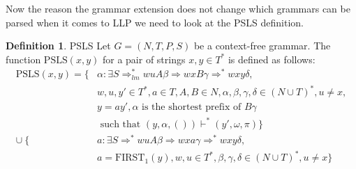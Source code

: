 \documentclass[a4paper,12pt]{article}
\newcommand\PSLS{\text{PSLS}}
\theoremstyle{definition}
\newtheorem{definition}{Definition}[section]
\begin{document}
Now the reason the grammar extension does not change which grammars can be parsed when it comes to LLP we need to look at the PSLS definition.
\begin{definition}{PSLS}
  Let $G = (N, T, P, S)$ be a context-free grammar. The function $\PSLS(x, y)$ for a pair of strings $x, y \in T^*$ is defined as follows:
  \begin{align*}
    \text{PSLS}(x, y) = \{ & \alpha : \exists S \Rightarrow^*_{lm} wuA\beta \Rightarrow wxB\gamma \Rightarrow^* wxy\delta, \\
    & w, u, y' \in T^*, a \in T, A, B \in N, \alpha, \beta, \gamma, \delta \in (N \cup T)^*, u \neq x, \\
    & y = ay', \alpha \text{ is the shortest prefix of } B\gamma \\ 
    & \text{ such that } (y, \alpha, ()) \vdash^* (y', \omega, \pi)\} \\
    \cup \: \{ & a : \exists S \Rightarrow^* wuA\beta \Rightarrow wxa\gamma \Rightarrow^* wxy\delta, \\
    & a = \text{FIRST}_1(y), w,u \in T^*, \beta, \gamma, \delta \in (N \cup T)^*, u \neq x \}
  \end{align*}
\end{definition}
\end{document}
